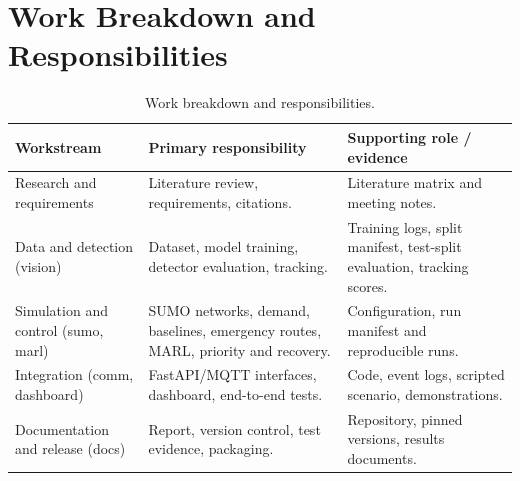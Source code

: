 \section{Work Breakdown and Responsibilities}
\begin{table}[htbp]
\centering
\small
\caption{Work breakdown and responsibilities.}
\label{tab:work-breakdown}
\begin{tabular}{p{}p{}p{}}
\toprule
Workstream & Primary responsibility & Supporting role / evidence\\
\midrule
Research and requirements & Literature review, requirements, citations. & Literature matrix and meeting notes.\\
Data and detection (vision) & Dataset, model training, detector evaluation, tracking. &
Training logs, split manifest, test-split evaluation, tracking scores.\\
Simulation and control (sumo, marl) & SUMO networks, demand, baselines, emergency routes, MARL, priority and
recovery. & Configuration, run manifest and reproducible runs.\\
Integration (comm, dashboard) & FastAPI/MQTT interfaces, dashboard, end-to-end tests. &
Code, event logs, scripted scenario, demonstrations.\\
Documentation and release (docs) & Report, version control, test evidence, packaging. &
Repository, pinned versions, results documents.\\
\bottomrule
\end{tabular}
\end{table}

